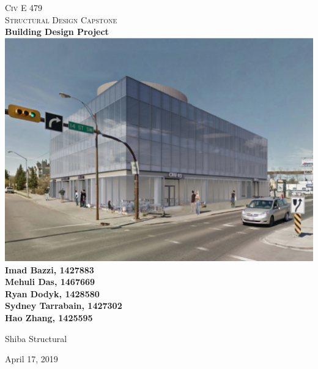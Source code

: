 \documentclass[12pt]{article}
\begin{document}
\begin{titlepage}
    \center
    \textsc{\LARGE Civ E 479}\\[1.5cm]
    \textsc{\Large Structural Design Capstone}\\[0.5cm]

    {\huge \bfseries Building Design Project}\\[0.4cm]
    \vspace{0.5cm}
    \includegraphics[width = \textwidth]{Assets/CoverPic.png}
    \textbf{Imad Bazzi, 1427883\\Mehuli Das, 1467669\\Ryan Dodyk, 1428580\\Sydney Tarrabain, 1427302\\Hao Zhang, 1425595}

    \huge
    Shiba Structural

    \Large
    April 17, 2019
\end{titlepage}
\end{document}
